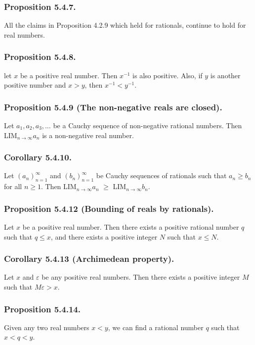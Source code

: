 \documentclass[12pt, letter]{article}
\newcommand{\an}{$(a_n)_{n=1}^\infty$ }
\newcommand{\bn}{$(b_n)_{n=1}^\infty$ }
\newcommand{\la}{LIM$_{n\to\infty}a_n$  }
\newcommand{\lb}{LIM$_{n\to\infty}b_n$}
\begin{document}
\subsubsection*{Proposition 5.4.7.}
All the claims in Proposition 4.2.9 which held for rationals, continue to hold for real numbers.
\subsubsection*{Proposition 5.4.8.}
let $x$ be a positive real number. Then $x^{-1}$ is also positive. Also, if $y$ is another positive number and $x>y$, then $x^{-1}<y^{-1}$.
\subsubsection*{Proposition 5.4.9 (The non-negative reals are closed).}
Let $a_1,a_2,a_3,\dotsc$ be a Cauchy sequence of non-negative rational numbers. Then \la is a non-negative real number.
\subsubsection*{Corollary 5.4.10.}
Let \an and \bn be Cauchy sequences of rationals such that $a_n\geq b_n$ for all $n\geq 1$. Then \la  $\geq$ \lb.
\subsubsection*{Proposition 5.4.12 (Bounding of reals by rationals).}
Let $x$ be a positive real number. Then there exists a positive rational number $q$ such that $q\leq x$, and there exists a positive integer $N$
such that $x\leq N$.
\subsubsection*{Corollary 5.4.13 (Archimedean property).}
Let $x$ and $\varepsilon$ be any positive real numbers. Then there exists a positive integer $M$ such that $M\varepsilon>x$.
\subsubsection*{Proposition 5.4.14.}
Given any two real numbers $x<y$, we can find a rational number $q$ such that $x<q<y$.
\end{document}
